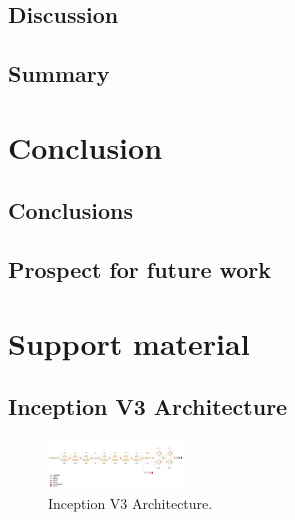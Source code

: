 \documentclass[
  twoside,
  11pt, a4paper,
  footinclude=true,
  headinclude=true,
  cleardoublepage=empty
]{scrbook}
\begin{document}
    \section{Discussion} \label{experiments:discussion}

    \section{Summary} \label{experiments:summary}

  \chapter{Conclusion} \label{conclusion}

    \section{Conclusions} \label{conclusion:conclusions}

    \section{Prospect for future work} \label{conclusion:future-work}



  

  \printindex


    \chapter{Support material} \label{support-material}
      \section{Inception V3 Architecture} \label{appendix:inception-v3}
        \begin{figure}[h]
          \centering
          \includegraphics[angle=90,width=0.32\textwidth]{"./img/inception-v3"}
          \caption[Inception V3 Architecture]{Inception V3 Architecture.}
        \end{figure}
\end{document}
